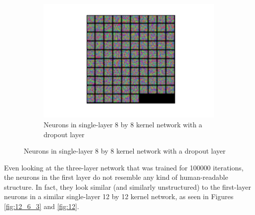 \documentclass[10pt]{article}
\begin{document}
\begin{figure}[!ht]
\begin{subfigure}[t]{0.32\textwidth}
	\includegraphics[width=\textwidth]{8_kernel_1_pool_1_dropout_5000_step_5000_after_20000.pdf}
	\caption{Neurons in single-layer 8 by 8 kernel network with a dropout layer}
	\label{fig:8dropoff}
\end{subfigure}
\end{figure}

Even looking at the three-layer network that was trained for 100000 iterations, the neurons in the first layer do not resemble any kind of human-readable structure. In fact, they look similar (and similarly unstructured) to the first-layer neurons in a similar single-layer 12 by 12 kernel network, as seen in Figures \ref{fig:12_6_3} and \ref{fig:12}.
\end{document}

